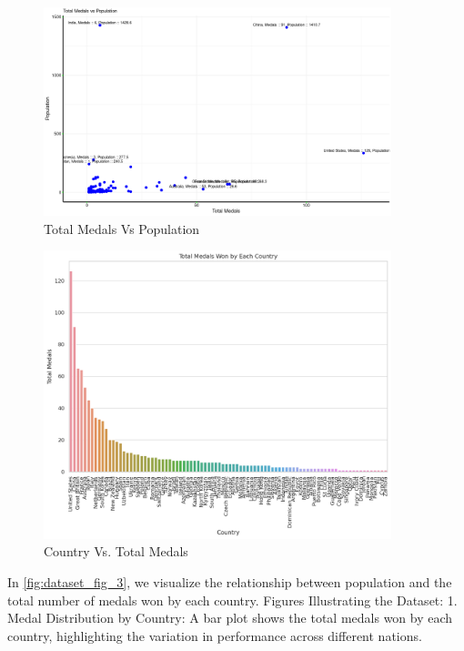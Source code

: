 \documentclass[a4paper,12pt]{article}
\begin{document}
\begin{figure}[H]
    \centering
    \includegraphics[width=0.9\textwidth]{images/Total_Medals_vs_Population_plot.png}
    \caption{Total Medals Vs Population}
    \label{fig:dataset_fig_22}
\end{figure}


\begin{figure}[H]
    \centering
    \includegraphics[width=0.9\textwidth]{images/plot_3.png}
    \caption{Country Vs. Total Medals}
    \label{fig:dataset_fig_3}
\end{figure}
In \autoref{fig:dataset_fig_3}, we visualize the relationship between population and the total number of medals won by each country.
\newline
Figures Illustrating the Dataset:
1. Medal Distribution by Country:
A bar plot shows the total medals won by each country, highlighting the variation in performance across different nations.
\end{document}
